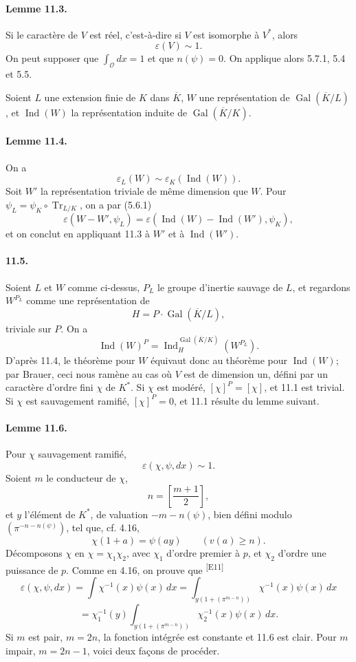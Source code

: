 \documentclass[10pt,letterpaper]{article}
\newcommand{\Gal}{\operatorname{Gal}}
\newcommand{\Ind}{\operatorname{Ind}}
\newcommand{\Tr}{\operatorname{Tr}}
\providecommand{\OO}{\mathcal O}
\providecommand{\OO}{\mathcal O}
\providecommand{\OO}{\mathcal O}
\providecommand{\OO}{\mathcal O}
\providecommand{\Gal}{\operatorname{Gal}}
\providecommand{\OO}{\mathcal O}
\providecommand{\Gal}{\operatorname{Gal}}
\providecommand{\Tr}{\operatorname{Tr}}
\providecommand{\OO}{\mathcal O}
\providecommand{\Gal}{\operatorname{Gal}}
\providecommand{\Tr}{\operatorname{Tr}}
\providecommand{\OO}{\mathcal O}
\providecommand{\Gal}{\operatorname{Gal}}
\providecommand{\Tr}{\operatorname{Tr}}
\providecommand{\Ind}{\operatorname{Ind}}
\newcommand{\auditmark}[1]{\textsuperscript{\normalfont\scriptsize[E#1]}}
\begin{document}
\paragraph{Lemme 11.3.} Si le caractère de \(V\) est réel, c'est-à-dire si \(V\) est isomorphe à \(V^*\), alors
\[
\varepsilon(V)\sim1.
\]
On peut supposer que \(\int_{\OO}dx=1\) et que \(n(\psi)=0\). On applique alors 5.7.1, 5.4 et 5.5.

Soient \(L\) une extension finie de \(K\) dans \(\overline K\), \(W\) une représentation de \(\Gal(\overline K/L)\), et \(\Ind(W)\) la représentation induite de \(\Gal(\overline K/K)\).

\paragraph{Lemme 11.4.} On a
\[
\varepsilon_L(W)\sim\varepsilon_K(\Ind(W)).
\]
Soit \(W'\) la représentation triviale de même dimension que \(W\). Pour \(\psi_L=\psi_K\circ\Tr_{L/K}\), on a par (5.6.1)
\[
\varepsilon(W-W',\psi_L)=\varepsilon(\Ind(W)-\Ind(W'),\psi_K),
\]
et on conclut en appliquant 11.3 à \(W'\) et à \(\Ind(W')\).

\paragraph{11.5.} Soient \(L\) et \(W\) comme ci-dessus, \(P_L\) le groupe d'inertie sauvage de \(L\), et regardons \(W^{P_L}\) comme une représentation de
\[
H=P\cdot\Gal(\overline K/L),
\]
triviale sur \(P\). On a
\[
\Ind(W)^P=\Ind_H^{\Gal(\overline K/K)}(W^{P_L}).
\]
D'après 11.4, le théorème pour \(W\) équivaut donc au théorème pour \(\Ind(W)\); par Brauer, ceci nous ramène au cas où \(V\) est de dimension un, défini par un caractère d'ordre fini \(\chi\) de \(K^*\). Si \(\chi\) est modéré, \([\chi]^P=[\chi]\), et 11.1 est trivial. Si \(\chi\) est sauvagement ramifié, \([\chi]^P=0\), et 11.1 résulte du lemme suivant.

\paragraph{Lemme 11.6.} Pour \(\chi\) sauvagement ramifié,
\[
\varepsilon(\chi,\psi,dx)\sim1.
\]
Soient \(m\) le conducteur de \(\chi\),
\[
n=\left[\frac{m+1}{2}\right],
\]
et \(y\) l'élément de \(K^*\), de valuation \(-m-n(\psi)\), bien défini modulo \((\pi^{-n-n(\psi)})\), tel que, cf. 4.16,
\[
\chi(1+a)=\psi(ay)\qquad(v(a)\ge n).
\]
Décomposons \(\chi\) en \(\chi=\chi_1\chi_2\), avec \(\chi_1\) d'ordre premier à \(p\), et \(\chi_2\) d'ordre une puissance de \(p\). Comme en 4.16, on prouve que
\noindent\auditmark{11}
\[
\tag{11.6.1}
\varepsilon(\chi,\psi,dx)
=
\int \chi^{-1}(x)\psi(x)\,dx
=
\int_{y(1+(\pi^{m-n}))}\chi^{-1}(x)\psi(x)\,dx
\]
\[
=
\chi_1^{-1}(y)
\int_{y(1+(\pi^{m-n}))}\chi_2^{-1}(x)\psi(x)\,dx.
\]
Si \(m\) est pair, \(m=2n\), la fonction intégrée est constante et 11.6 est clair. Pour \(m\) impair, \(m=2n-1\), voici deux façons de procéder.
\end{document}
